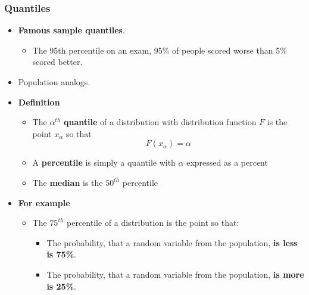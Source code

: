 \documentclass[10pt,article]{article}
\begin{document}
\subsubsection{Quantiles}
\label{sec:orgcb1916d}
\begin{itemize}
\item \textbf{Famous sample quantiles}.
\begin{itemize}
\item The 95th percentile on an exam, 95\% of people scored worse than 5\% scored better.
\end{itemize}
\item {\color{green}Population analogs}.
\end{itemize}
\begin{itemize}
\item \textbf{Definition}
\label{sec:org3fc9160}
\begin{itemize}
\item The  \(\alpha^{th}\) \textbf{\textbf{quantile}} of a distribution with distribution function \(F\) is the point \(x_\alpha\) so that
$$F(x_\alpha) = \alpha$$
\item A \textbf{\textbf{percentile}} is simply a quantile with \(\alpha\) expressed as a percent
\item The \textbf{\textbf{median}} is the \(50^{th}\) percentile
\end{itemize}
\item \textbf{For example}
\label{sec:orgbfb1e2f}
\begin{itemize}
\item The {\color{green}\(75^{th}\) percentile} of a distribution is the point so that:
\begin{itemize}
\item The probability, that a random variable from the population, \textbf{is less is 75\%}.
\item The probability, that a random variable from the population, \textbf{is more is 25\%}.
\end{itemize}
\end{itemize}
\end{itemize}
\end{document}
